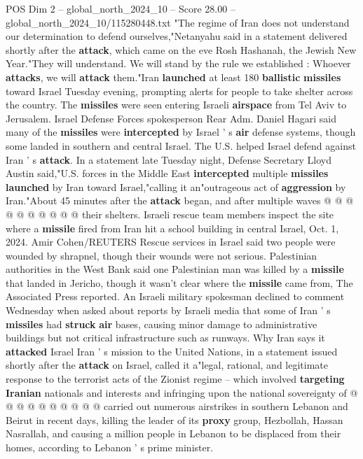 \begin{textsample}{POS Dim 2 – global\_north\_2024\_10 – Score 28.00 – global\_north\_2024\_10/115280448.txt}  \label{ex:f2_pos_076}
"The regime of Iran does not understand our determination to defend ourselves,"Netanyahu said in a statement delivered shortly after the \textbf{attack}, which came on the eve Rosh Hashanah, the Jewish New Year."They will understand.
We will stand by the rule we established : Whoever \textbf{attacks}, we will \textbf{attack} them."Iran \textbf{launched} at least 180 \textbf{ballistic} \textbf{missiles} toward Israel Tuesday evening, prompting alerts for people to take shelter across the country.
The \textbf{missiles} were seen entering Israeli \textbf{airspace} from Tel Aviv to Jerusalem.
Israel Defense Forces spokesperson Rear Adm.
Daniel Hagari said many of the \textbf{missiles} were \textbf{intercepted} by Israel ' s \textbf{air} defense systems, though some landed in southern and central Israel.
The U.S. helped Israel defend against Iran ' s \textbf{attack}.
In a statement late Tuesday night, Defense Secretary Lloyd Austin said,"U.S. forces in the Middle East \textbf{intercepted} multiple \textbf{missiles} \textbf{launched} by Iran toward Israel,"calling it an"outrageous act of \textbf{aggression} by Iran."About 45 minutes after the \textbf{attack} began, and after multiple waves @ @ @ @ @ @ @ @ @ @ their shelters.
Israeli rescue team members inspect the site where a \textbf{missile} fired from Iran hit a school building in central Israel, Oct. 1, 2024.
Amir Cohen/REUTERS Rescue services in Israel said two people were wounded by shrapnel, though their wounds were not serious.
Palestinian authorities in the West Bank said one Palestinian man was killed by a \textbf{missile} that landed in Jericho, though it wasn't clear where the \textbf{missile} came from, The Associated Press reported.
An Israeli military spokesman declined to comment Wednesday when asked about reports by Israeli media that some of Iran ' s \textbf{missiles} had \textbf{struck} \textbf{air} bases, causing minor damage to administrative buildings but not critical infrastructure such as runways.
Why Iran says it \textbf{attacked} Israel Iran ' s mission to the United Nations, in a statement issued shortly after the \textbf{attack} on Israel, called it a"legal, rational, and legitimate response to the terrorist acts of the Zionist regime -- which involved \textbf{targeting} \textbf{Iranian} nationals and interests and infringing upon the national sovereignty of @ @ @ @ @ @ @ @ @ @ carried out numerous airstrikes in southern Lebanon and Beirut in recent days, killing the leader of its \textbf{proxy} group, Hezbollah, Hassan Nasrallah, and causing a million people in Lebanon to be displaced from their homes, according to Lebanon ' s prime minister.

\end{textsample}
